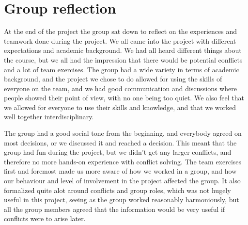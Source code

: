 \chapter{Group reflection}
\label{chap:reflection}
%
At the end of the project the group sat down to reflect on the experiences and teamwork done during the project. We all came into the project with different expectations and academic background. We had all heard different things about the course, but we all had the impression that there would be potential conflicts and a lot of team exercises. The group had a wide variety in terms of academic background, and the project we chose to do allowed for using the skills of everyone on the team, and we had good communication and discussions where people showed their point of view, with no one being too quiet. We also feel that we allowed for everyone to use their skills and knowledge, and that we worked well together interdisciplinary.

The group had a good social tone from the beginning, and everybody agreed on most decisions, or we discussed it and reached a decision. This meant that the group had fun during the project, but we didn't get any larger conflicts, and therefore no more hands-on experience with conflict solving. The team exercises first and foremost made us more aware of how we worked in a group, and how our behaviour and level of involvement in the project affected the group. It also formalized quite alot around conflicts and group roles, which was not hugely useful in this project, seeing as the group worked reasonably harmoniously, but all the group members agreed that the information would be very useful if conflicts were to arise later. 
